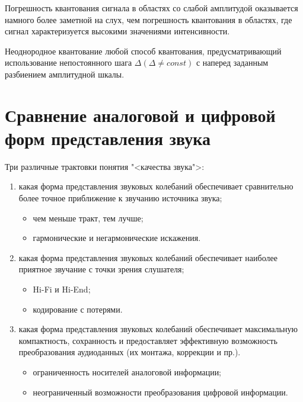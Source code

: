 \documentclass{beamer}
\begin{document}
\begin{frame}
Погрешность квантования сигнала в областях со слабой амплитудой оказывается намного более заметной на слух, чем погрешность квантования в областях, где сигнал характеризуется высокими значениями интенсивности.
\begin{block}{Неоднородное квантование}
любой способ квантования, предусматривающий использование непостоянного шага $\Delta (\Delta\neq const)$ с наперед заданным разбиением амплитудной шкалы. 
\end{block}
\end{frame}

\section[Аналоговое VS Цифровое]{Сравнение аналоговой и цифровой форм представления звука}
Три различные трактовки понятия "<качества звука">:
\begin{enumerate}
\item какая форма представления звуковых колебаний обеспечивает сравнительно более точное приближение к звучанию источника звука;
  \begin{itemize}
     \item чем меньше тракт, тем лучше;
     \item гармонические и негармонические искажения.
  \end{itemize}
\item какая форма представления звуковых колебаний обеспечивает наиболее приятное звучание с точки зрения слушателя;
  \begin{itemize}
     \item Hi-Fi и Hi-End;
     \item кодирование с потерями.
  \end{itemize}
\item какая форма представления звуковых колебаний обеспечивает максимальную компактность, сохранность и предоставляет эффективную возможность преобразования аудиоданных (их монтажа, коррекции и пр.).
  \begin{itemize}
     \item ограниченность носителей аналоговой информации;
     \item неограниченный возможности преобразования цифровой информации.
  \end{itemize}
\end{enumerate}
\end{document}
